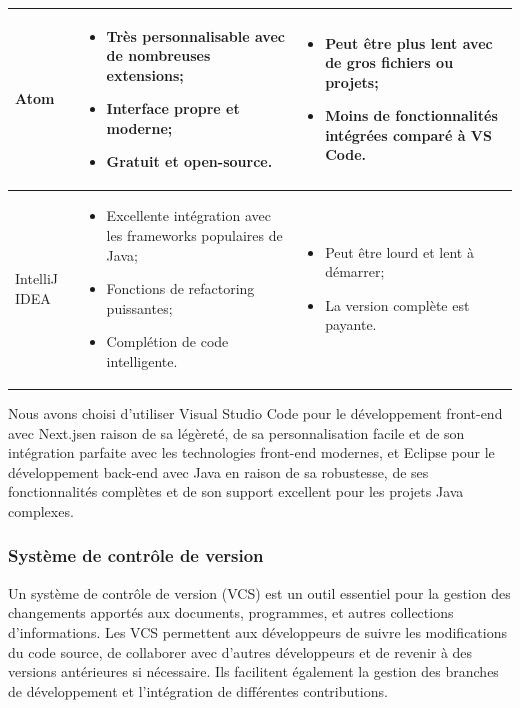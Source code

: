 \documentclass[12pt]{report}
\begin{document}
\begin{longtable}{|p{3cm}|p{5.5cm}|p{5.5cm}|}
						 \hline
						Atom & 
						\begin{itemize}
							\item Très personnalisable avec de nombreuses extensions;
							\item Interface propre et moderne;
							\item Gratuit et open-source.
						\end{itemize}
						&
						\begin{itemize}
							\item Peut être plus lent avec de gros fichiers ou projets;
							\item Moins de fonctionnalités intégrées comparé à VS Code.
						\end{itemize}\\
						 \hline
						IntelliJ IDEA & 
						\begin{itemize}
							\item Excellente intégration avec les frameworks populaires de Java;
							\item Fonctions de refactoring puissantes;
							\item Complétion de code intelligente.
						\end{itemize}
						&
						\begin{itemize}
							\item Peut être lourd et lent à démarrer;
							\item La version complète est payante.
						\end{itemize}\\
						\hline

				    \end{longtable}


				Nous avons choisi d'utiliser Visual Studio Code pour le développement front-end avec Next.jsen raison de sa légèreté, de sa personnalisation facile et de son intégration parfaite avec les technologies front-end modernes, et Eclipse pour le développement back-end avec Java en raison de sa robustesse, de ses fonctionnalités complètes et de son support excellent pour les projets Java complexes.


				\subsubsection{Système de contrôle de version}

				\hspace{15pt} Un système de contrôle de version (VCS) est un outil essentiel pour la gestion des changements apportés aux documents, programmes, et autres collections d'informations. Les VCS permettent aux développeurs de suivre les modifications du code source, de collaborer avec d'autres développeurs et de revenir à des versions antérieures si nécessaire. Ils facilitent également la gestion des branches de développement et l'intégration de différentes contributions.\\
\end{document}
